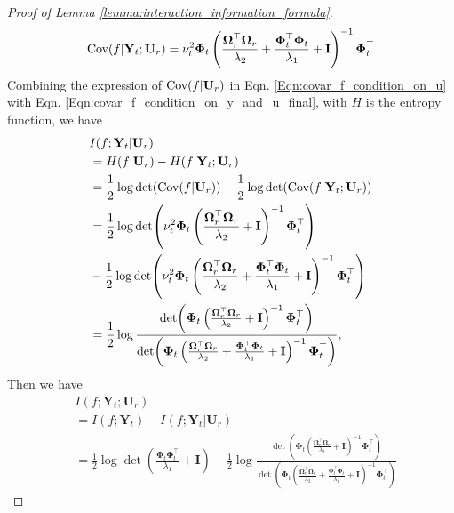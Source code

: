 \begin{proof}[Proof of Lemma \ref{lemma:interaction_information_formula}]
\begin{equation}
\label{Eqn:covar_f_condition_on_y_and_u_final}
    \textup{Cov}(f \rvert \mathbf{Y}_t; \mathbf{U}_r) = \nu_t^2\boldsymbol{\Phi}_t \left(\frac{\boldsymbol{\Omega}_r^\top\boldsymbol{\Omega}_r}{\lambda_2}+\frac{\boldsymbol{\Phi}_t^\top \boldsymbol{\Phi}_t} {\lambda_1} + \mathbf{I}\right)^{-1} \boldsymbol{\Phi}_t^\top
\end{equation}
Combining the expression of $\textup{Cov}(f\rvert \mathbf{U}_r)$ in Eqn. \ref{Eqn:covar_f_condition_on_u} with Eqn. \ref{Eqn:covar_f_condition_on_y_and_u_final}, with $H$ is the entropy function, we have
\begin{align}
     & I(f;\mathbf{Y}_t \rvert \mathbf{U}_r)  \nonumber
\\
     &= H(f \rvert \mathbf{U}_r) - H(f \rvert \mathbf{Y}_t; \mathbf{U}_r)  \nonumber
\\
     & = \frac{1}{2}\log\det (\textup{Cov}(f \rvert \mathbf{U}_r)) - \frac{1}{2}\log\det (\textup{Cov}(f \rvert \mathbf{Y}_t;  \mathbf{U}_r)) \nonumber
\\
     & = \frac{1}{2}\log \det (\nu_t^2\boldsymbol{\Phi}_t \left(\frac{\boldsymbol{\Omega}_r^\top \boldsymbol{\Omega}_r}{\lambda_2} + \mathbf{I}\right)^{-1} \boldsymbol{\Phi}_t^\top) \nonumber 
\\
     & - \frac{1}{2}\log\det (\nu_t^2\boldsymbol{\Phi}_t \left(\frac{\boldsymbol{\Omega}_r^\top\boldsymbol{\Omega}_r}{\lambda_2}+\frac{\boldsymbol{\Phi}_t^\top \boldsymbol{\Phi}_t} {\lambda_1} + \mathbf{I}\right)^{-1} \boldsymbol{\Phi}_t^\top) \nonumber
\\
     &= \frac{1}{2} \log \frac{\det(\boldsymbol{\Phi}_t \left(\frac{\boldsymbol{\Omega}_r^\top \boldsymbol{\Omega}_r}{\lambda_2} + \mathbf{I}\right)^{-1} \boldsymbol{\Phi}_t^\top)}{\det(\boldsymbol{\Phi}_t \left(\frac{\boldsymbol{\Omega}_r^\top\boldsymbol{\Omega}_r}{\lambda_2}+\frac{\boldsymbol{\Phi}_t^\top \boldsymbol{\Phi}_t} {\lambda_1} + \mathbf{I}\right)^{-1} \boldsymbol{\Phi}_t^\top)}, \label{Eqn:conditional_information_f_and_Yt_give_Ur}
\end{align}
Then we have 
\begin{align}
    & I (f; \mathbf{Y}_t; \mathbf{U}_r) \nonumber 
\\
    & =  I(f; \mathbf{Y}_t) - I (f; \mathbf{Y}_t \rvert \mathbf{U}_r) \nonumber
\\
        &= \frac{1}{2} \log \det (\frac{\boldsymbol{\Phi}_t\boldsymbol{\Phi}_t^\top}{\lambda_1} +\mathbf{I}) - \frac{1}{2} \log \frac{\det(\boldsymbol{\Phi}_t \left(\frac{\boldsymbol{\Omega}_r^\top \boldsymbol{\Omega}_r}{\lambda_2} + \mathbf{I}\right)^{-1} \boldsymbol{\Phi}_t^\top)}{\det(\boldsymbol{\Phi}_t \left(\frac{\boldsymbol{\Omega}_r^\top\boldsymbol{\Omega}_r}{\lambda_2}+\frac{\boldsymbol{\Phi}_t^\top \boldsymbol{\Phi}_t} {\lambda_1} + \mathbf{I}\right)^{-1} \boldsymbol{\Phi}_t^\top)} \nonumber

\end{align}
\end{proof}
